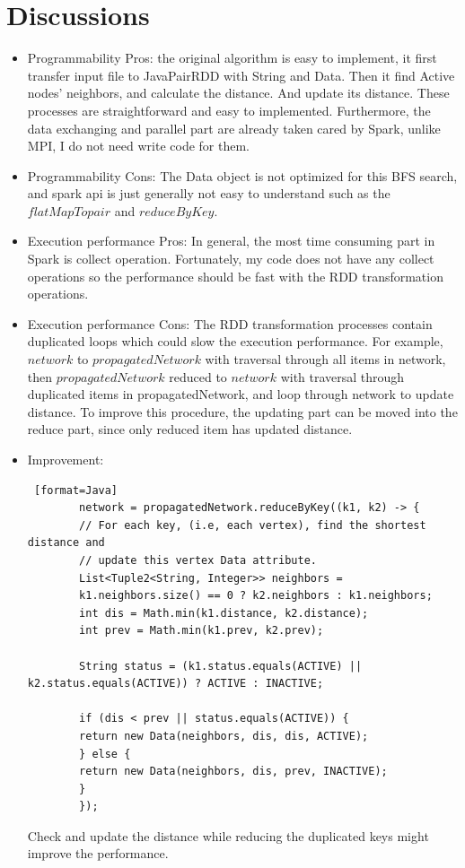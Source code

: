 \documentclass[11pt, letterpaper]{article}
\begin{document}
	\pagebreak
	
	\section {Discussions}
	
	\begin{itemize} 
		\item Programmability Pros: the original algorithm is easy to implement, it first transfer input file to JavaPairRDD with String and Data. Then it find Active nodes' neighbors, and calculate the distance. And update its distance. These processes are straightforward and easy to implemented. Furthermore, the data exchanging and parallel part are already taken cared by Spark, unlike MPI, I do not need write code for them. \par
		\item Programmability Cons: The Data object is not optimized for this BFS search, and spark api is just generally not easy to understand such as the $flatMapTopair$ and $reduceByKey$.\par
		\item Execution performance Pros: In general, the most time consuming part in Spark is collect operation. Fortunately, my code does not have any collect operations so the performance should be fast with the RDD transformation operations. \par
		\item Execution performance Cons: The RDD transformation processes contain duplicated loops which could slow the execution performance. For example, $network$ to $propagatedNetwork$ with traversal through all items in network, then $propagatedNetwork$ reduced to $network$ with traversal through duplicated items in propagatedNetwork, and loop through network to update distance. To improve this procedure, the updating part can be moved into the reduce part, since only reduced item has updated distance.\par
		
		\item Improvement:
		\begin{lstlisting} [format=Java]
		network = propagatedNetwork.reduceByKey((k1, k2) -> {
		// For each key, (i.e, each vertex), find the shortest distance and
		// update this vertex Data attribute.
		List<Tuple2<String, Integer>> neighbors =
		k1.neighbors.size() == 0 ? k2.neighbors : k1.neighbors;
		int dis = Math.min(k1.distance, k2.distance);
		int prev = Math.min(k1.prev, k2.prev);
		
		String status = (k1.status.equals(ACTIVE) || k2.status.equals(ACTIVE)) ? ACTIVE : INACTIVE;
		
		if (dis < prev || status.equals(ACTIVE)) {
		return new Data(neighbors, dis, dis, ACTIVE);
		} else {
		return new Data(neighbors, dis, prev, INACTIVE);
		}
		});
		\end{lstlisting}
		Check and update the distance while reducing the duplicated keys might improve the performance.
		
	\end{itemize}
		
\end{document}
